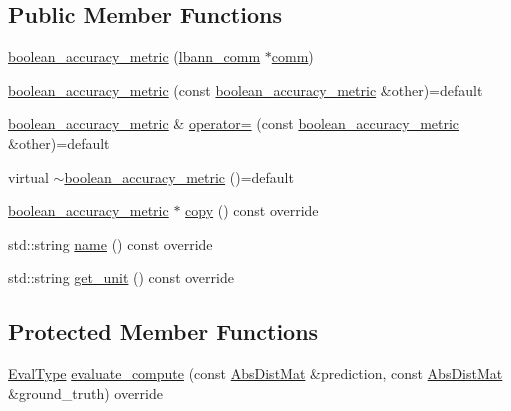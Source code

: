 \subsection*{Public Member Functions}
\begin{DoxyCompactItemize}
\item 
\hyperlink{classlbann_1_1boolean__accuracy__metric_a91e8f2a608e0594e8875c58d584bda9c}{boolean\+\_\+accuracy\+\_\+metric} (\hyperlink{classlbann_1_1lbann__comm}{lbann\+\_\+comm} $\ast$\hyperlink{file__io_8cpp_ab048c6f9fcbcfaa57ce68b00263dbebe}{comm})
\item 
\hyperlink{classlbann_1_1boolean__accuracy__metric_af79f675c84b0e90ecd449f8be3fbc213}{boolean\+\_\+accuracy\+\_\+metric} (const \hyperlink{classlbann_1_1boolean__accuracy__metric}{boolean\+\_\+accuracy\+\_\+metric} \&other)=default
\item 
\hyperlink{classlbann_1_1boolean__accuracy__metric}{boolean\+\_\+accuracy\+\_\+metric} \& \hyperlink{classlbann_1_1boolean__accuracy__metric_afb79aa75d193aaa090ce81352a5690e6}{operator=} (const \hyperlink{classlbann_1_1boolean__accuracy__metric}{boolean\+\_\+accuracy\+\_\+metric} \&other)=default
\item 
virtual \hyperlink{classlbann_1_1boolean__accuracy__metric_a08f019909aa96a49a48d29fd8c2d1df4}{$\sim$boolean\+\_\+accuracy\+\_\+metric} ()=default
\item 
\hyperlink{classlbann_1_1boolean__accuracy__metric}{boolean\+\_\+accuracy\+\_\+metric} $\ast$ \hyperlink{classlbann_1_1boolean__accuracy__metric_ae3a97a9ac1caccfe8ac46ad1a0df01a4}{copy} () const override
\item 
std\+::string \hyperlink{classlbann_1_1boolean__accuracy__metric_a88edde5abce60809dbaaf034b166b09e}{name} () const override
\item 
std\+::string \hyperlink{classlbann_1_1boolean__accuracy__metric_abde43253ef54b243f9faa1b1adea0672}{get\+\_\+unit} () const override
\end{DoxyCompactItemize}
\subsection*{Protected Member Functions}
\begin{DoxyCompactItemize}
\item 
\hyperlink{base_8hpp_a3266f5ac18504bbadea983c109566867}{Eval\+Type} \hyperlink{classlbann_1_1boolean__accuracy__metric_acac2d198f516990fe9b87f3abefae635}{evaluate\+\_\+compute} (const \hyperlink{base_8hpp_a9a697a504ae84010e7439ffec862b470}{Abs\+Dist\+Mat} \&prediction, const \hyperlink{base_8hpp_a9a697a504ae84010e7439ffec862b470}{Abs\+Dist\+Mat} \&ground\+\_\+truth) override
\end{DoxyCompactItemize}


